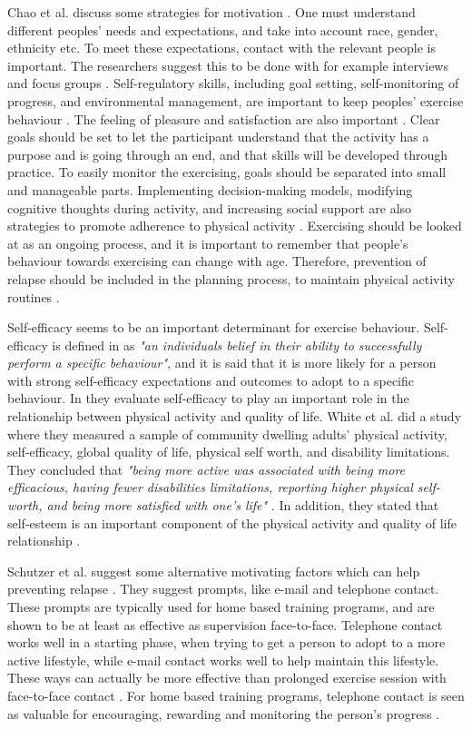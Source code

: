 Chao et al. discuss some strategies for motivation \cite{chao}. One must understand different peoples' needs and expectations, and take into account race, gender, ethnicity etc. To meet these expectations, contact with the relevant people is important. The researchers suggest this to be done with for example interviews and focus groups \cite{chao}. Self-regulatory skills, including goal setting, self-monitoring of progress, and environmental management, are important to keep peoples' exercise behaviour \cite{chao} \cite{schutzer}. The feeling of pleasure and satisfaction are also important \cite{schutzer}.  Clear goals should be set to let the participant understand that the activity has a purpose and is going through an end, and that skills will be developed through practice. To easily monitor the exercising, goals should be separated into small and manageable parts. Implementing decision-making models, modifying cognitive thoughts during activity, and increasing social support are also strategies to promote adherence to physical activity \cite{chao}.  Exercising should be looked at as an ongoing process, and it is important to remember that people's behaviour towards exercising can change with age. Therefore, prevention of relapse should be included in the planning process, to maintain physical activity routines \cite{chao}. 

Self-efficacy seems to be an important determinant for exercise behaviour. Self-efficacy is defined in \cite{schutzer} as \emph{"an individuals belief in their ability to successfully perform a specific behaviour"}, and it is said that it is more likely for a person with strong self-efficacy expectations and outcomes to adopt to a specific behaviour. In \cite{white} they evaluate self-efficacy to play an important role in the relationship between physical activity and quality of life. White et al. did a study where they measured a sample of community dwelling adults' physical activity, self-efficacy, global quality of life, physical self worth, and disability limitations. They concluded that \emph{"being more active was associated with being more efficacious, having fewer disabilities limitations, reporting higher physical self-worth, and being more satisfied with one's life"} \cite{white}. In addition, they stated that self-esteem is an important component of the physical activity and quality of life relationship \cite{white}. 

Schutzer et al. suggest some alternative motivating factors which can help preventing relapse \cite{schutzer}. They suggest prompts, like e-mail and telephone contact. These prompts are typically used for home based training programs, and are shown to be at least as effective as supervision face-to-face. Telephone contact works well in a starting phase, when trying to get a person to adopt to a more active lifestyle, while e-mail contact works well to help maintain this lifestyle. These ways can actually be more effective than prolonged exercise session with face-to-face contact \cite{schutzer}. For home based training programs, telephone contact is seen as valuable for encouraging, rewarding and monitoring the person's progress \cite{chao}.  

